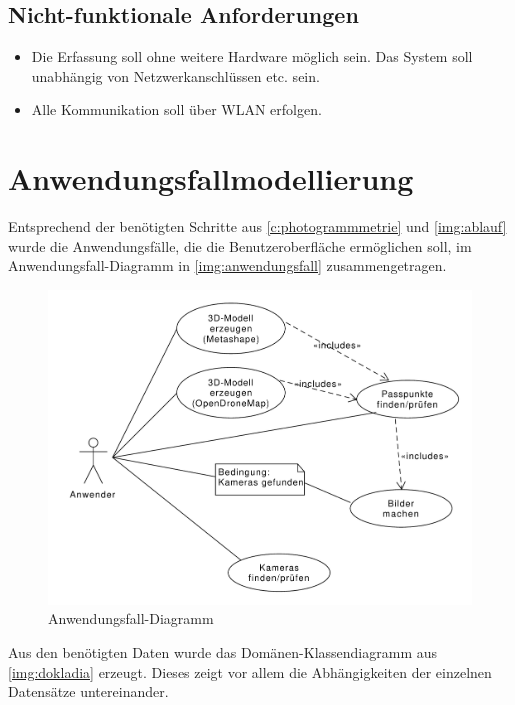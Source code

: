 \documentclass[./00_PhotoBox.tex]{subfiles}
\begin{document}
\subsection{Nicht-funktionale Anforderungen}
\begin{itemize}
    \item Die Erfassung soll ohne weitere Hardware möglich sein. Das System soll unabhängig von Netzwerkanschlüssen etc. sein.
    \item Alle Kommunikation soll über WLAN erfolgen.
\end{itemize}

\section{Anwendungsfallmodellierung}
\label{sec:Anwendungsfallmodellierung}

Entsprechend der benötigten Schritte aus \autoref{c:photogrammmetrie} und \autoref{img:ablauf} wurde die Anwendungsfälle, die die Benutzeroberfläche ermöglichen soll, im Anwendungsfall-Dia\-gramm in \autoref{img:anwendungsfall} zusammengetragen.

\begin{figure}[!htbp]
    \centering
    \includegraphics[width=1\textwidth]{./img/uml_usecases.pdf}
    \centering
    \caption{Anwendungsfall-Diagramm} %
    \label{img:anwendungsfall} %
\end{figure}

Aus den benötigten Daten wurde das Domänen-Klassendiagramm aus \autoref{img:dokladia} erzeugt. Dieses zeigt vor allem die Abhängigkeiten der einzelnen Datensätze untereinander.
\end{document}
